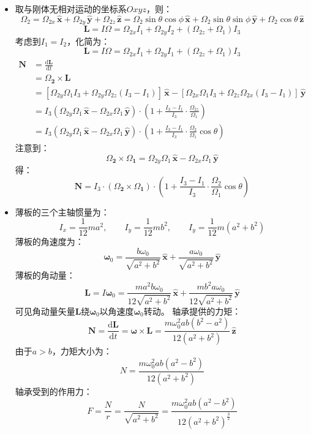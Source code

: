\documentclass[a4paper,fontset=windows]{ctexart}
\begin{document}
\begin{itemize}
        \bigskip
        \item[5.9]
        取与刚体无相对运动的坐标系$Oxyz$，则：
        \[
        \varOmega_2 = \varOmega_{2x}\,\bm{\hat{x}} + \varOmega_{2y}\,\bm{\hat{y}} + \varOmega_{2z}\,\bm{\hat{z}} = \varOmega_2\sin\theta\cos\phi\,\bm{\hat{x}} + \varOmega_2\sin\theta\sin\phi\,\bm{\hat{y}} + \varOmega_2\cos\theta\,\bm{\hat{z}}
        \]
        \[
        \bm{L} = I\bm{\varOmega} = \varOmega_{2x}I_1 + \varOmega_{2y}I_2 + (\varOmega_{2z}+\varOmega_1)I_3
        \]
        考虑到$I_1 = I_2$，化简为：
        \[
        \bm{L} = I\bm{\varOmega} = \varOmega_{2x}I_1 + \varOmega_{2y}I_1 + (\varOmega_{2z}+\varOmega_1)I_3
        \]
        \begin{align*}
        \bm{N}
        &= \frac{\mathrm{d}\bm{L}}{\mathrm{d}t} \\
        &= \bm{\varOmega_2} \times \bm{L} \\
        &= \left[\varOmega_{2y}\varOmega_1I_3 + \varOmega_{2y}\varOmega_{2z}(I_3-I_1)\right]\,\bm{\hat{x}} - \left[\varOmega_{2x}\varOmega_1I_3 + \varOmega_{2z}\varOmega_{2x}(I_3-I_1)\right]\,\bm{\hat{y}} \\
        &= I_3\left(\varOmega_{2y}\varOmega_1\,\bm{\hat{x}} - \varOmega_{2x}\varOmega_1\,\bm{\hat{y}}\right)\cdot\left(1 + \frac{I_3-I_1}{I_3}\cdot\frac{\varOmega_{2z}}{\varOmega_1}\right) \\
        &= I_3\left(\varOmega_{2y}\varOmega_1\,\bm{\hat{x}} - \varOmega_{2x}\varOmega_1\,\bm{\hat{y}}\right)\cdot\left(1 + \frac{I_3-I_1}{I_3}\cdot\frac{\varOmega_2}{\varOmega_1}\cos\theta\right)
        \end{align*}
        注意到：
        \[
        \bm{\varOmega_2} \times \bm{\varOmega_1} = \varOmega_{2y}\varOmega_1\,\bm{\hat{x}} - \varOmega_{2x}\varOmega_1\,\bm{\hat{y}}
        \]
        得：
        \[
        \bm{N} = I_3 \cdot (\bm{\varOmega_2}\times\bm{\varOmega_1}) \cdot \left(1 + \frac{I_3-I_1}{I_3}\cdot\frac{\varOmega_2}{\varOmega_1}\cos\theta\right)
        \]

        \bigskip
        \item[5.10]
        薄板的三个主轴惯量为：
        \[
        I_x = \frac{1}{12}ma^2,\qquad I_y = \frac{1}{12}mb^2,\qquad I_y = \frac{1}{12}m(a^2+b^2)
        \]
        薄板的角速度为：
        \[
        \bm{\omega}_0 = \frac{b\omega_0}{\sqrt{\left.a^2+b^2\right.}}\,\bm{\hat{x}} + \frac{a\omega_0}{\sqrt{\left.a^2+b^2\right.}}\,\bm{\hat{y}}
        \]
        薄板的角动量：
        \[
        \bm{L} = I\bm{\omega}_0 = \frac{ma^2b\omega_0}{12\sqrt{\left.a^2+b^2\right.}}\,\bm{\hat{x}} + \frac{mb^2a\omega_0}{12\sqrt{\left.a^2+b^2\right.}}\,\bm{\hat{y}}
        \]
        可见角动量矢量$\bm{L}$绕$\bm{\omega}_0$以角速度$\bm{\omega}_0$转动。
        轴承提供的力矩：
        \[
        \bm{N} = \frac{\mathrm{d}\bm{L}}{\mathrm{d}t} = \bm{\omega} \times \bm{L} = \frac{m\omega_0^2ab(b^2-a^2)}{12\left(a^2+b^2\right)}\,\bm{\hat{z}}
        \]
        由于$a > b$，力矩大小为：
        \[
        N = \frac{m\omega_0^2ab(a^2-b^2)}{12\left(a^2+b^2\right)}
        \]
        轴承受到的作用力：
        \[
        F = \frac{N}{r} = \frac{N}{\sqrt{a^2+b^2}} = \frac{m\omega_0^2ab(a^2-b^2)}{12\left(a^2+b^2\right)^{\frac{3}{2}}}
        \]


\end{itemize}
\end{document}
